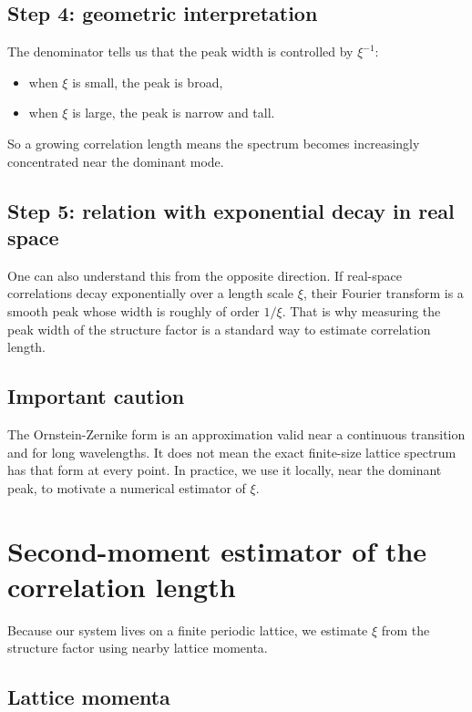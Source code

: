 \documentclass[11pt]{article}
\begin{document}
\subsection{Step 4: geometric interpretation}

The denominator tells us that the peak width is controlled by $\xi^{-1}$:
\begin{itemize}
    \item when $\xi$ is small, the peak is broad,
    \item when $\xi$ is large, the peak is narrow and tall.
\end{itemize}
So a growing correlation length means the spectrum becomes increasingly concentrated near the dominant mode.

\subsection{Step 5: relation with exponential decay in real space}

One can also understand this from the opposite direction. If real-space correlations decay exponentially over a length scale $\xi$, their Fourier transform is a smooth peak whose width is roughly of order $1/\xi$. That is why measuring the peak width of the structure factor is a standard way to estimate correlation length.

\subsection{Important caution}

The Ornstein-Zernike form is an approximation valid near a continuous transition and for long wavelengths. It does not mean the exact finite-size lattice spectrum has that form at every point. In practice, we use it locally, near the dominant peak, to motivate a numerical estimator of $\xi$.

\section{Second-moment estimator of the correlation length}

Because our system lives on a finite periodic lattice, we estimate $\xi$ from the structure factor using nearby lattice momenta.

\subsection{Lattice momenta}
\end{document}
